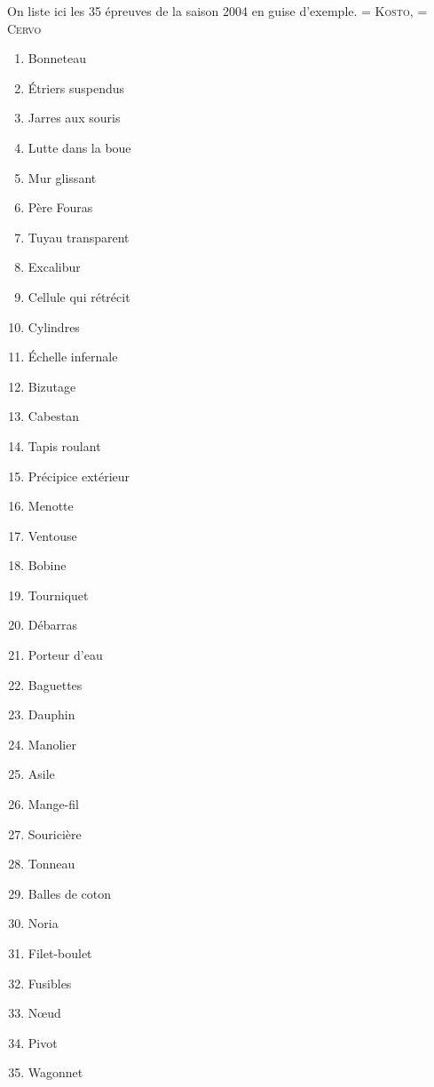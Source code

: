 \documentclass[french,twocolumn,twoside]{article}
\newcommand\cervo{{\Fontlukas\large\textsc{Cervo}}\xspace}
\newcommand\kosto{{\Fontlukas\large\textsc{Kosto}}\xspace}
\newcommand\bulb{{\faLightbulbO}\xspace}
\newcommand\fist{{\faHandRockO}\xspace}
\begin{document}
On liste ici les 35 épreuves de la saison 2004 en guise d'exemple.
\fist = \kosto, \bulb = \cervo
\begin{minipage}{0.5\textwidth}
\begin{multicols}{2}
\begin{enumerate}
	\item Bonneteau \bulb
	\item Étriers suspendus \fist
	\item Jarres aux souris \bulb
	\item Lutte dans la boue \fist
	\item Mur glissant \fist
	\item Père Fouras \bulb
	\item Tuyau transparent \fist
	\item Excalibur \fist
	\item Cellule qui rétrécit \fist
	\item Cylindres \fist
	\item Échelle infernale \fist
	\item Bizutage \fist
	\item Cabestan \fist
	\item Tapis roulant \fist
	\item Précipice extérieur \fist
	\item Menotte \bulb
	\item Ventouse \fist
	\item Bobine \fist
	\item Tourniquet \fist
	\item Débarras \bulb
	\item Porteur d'eau \fist
	\item Baguettes \fist
	\item Dauphin \fist
	\item Manolier \fist
	\item Asile \fist
	\item Mange-fil \fist
	\item Souricière \fist
	\item Tonneau \fist
	\item Balles de coton \fist
	\item Noria \fist
	\item Filet-boulet \fist
	\item Fusibles \fist
	\item Nœud \bulb
	\item Pivot \fist
	\item Wagonnet \fist
\end{enumerate}
\end{multicols}
\end{minipage}
\medskip
\end{document}
